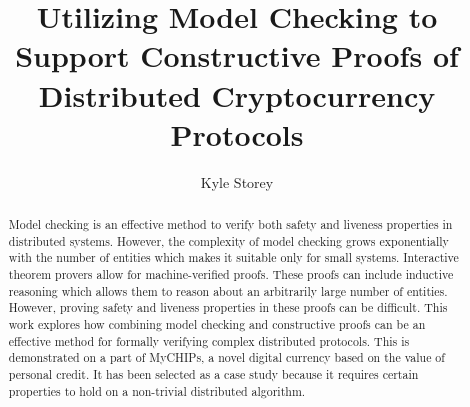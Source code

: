 \documentclass[runningheads]{llncs}
\begin{document}
%
\title{Utilizing Model Checking to Support Constructive Proofs
of Distributed Cryptocurrency Protocols}

\author{Kyle Storey}
\\


\begin{abstract}

Model checking is an effective method to verify both safety and liveness properties in distributed systems. However, the complexity of model checking grows exponentially with the number of entities which makes it suitable only for small systems.
Interactive theorem provers allow for machine-verified proofs. These proofs can include inductive reasoning which allows them to reason about an arbitrarily large number of entities. However, proving safety and liveness properties in these proofs can be difficult.
This work explores how combining model checking and constructive proofs can be an effective method for formally verifying complex distributed protocols. This is demonstrated on a part of MyCHIPs, a novel digital currency based on the value of personal credit\cite{bateman_myCHIPs}. It has been selected as a case study because it requires certain properties to hold on a non-trivial distributed algorithm. 

\end{abstract}


\end{document}
